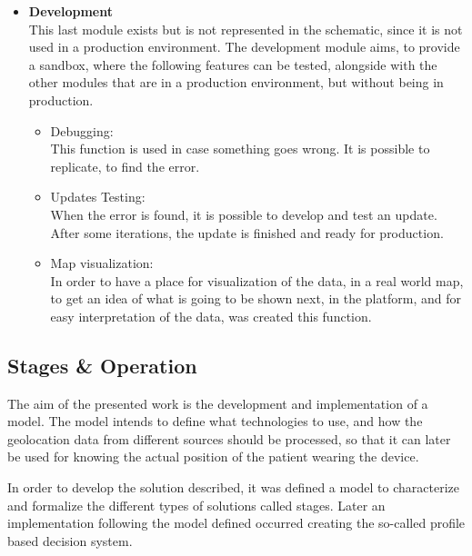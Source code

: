\begin{itemize}
   \item \textbf{Development}\\
   This last module exists but is not represented in the schematic, since it is not used in a production environment. The development module aims, to provide a sandbox, where the following features can be tested, alongside with the other modules that are in a production environment, but without being in production.
   \begin{itemize}
     \item Debugging:  \\This  function is used in case something goes wrong. It is possible to replicate,  to find the error.
   \end{itemize}
   \begin{itemize}
     \item Updates Testing: \\When the error is found, it is possible to develop and test an update. After some iterations, the update is finished and ready for production. 
   \end{itemize}
   \begin{itemize}
     \item Map visualization: \\ In order to have a place for visualization of the data, in a real world map, to get an idea of what is going to be shown next, in the platform, and for easy interpretation of the data, was created this function.
   \end{itemize}
\end{itemize}









\newpage
\subsection{Stages \& Operation}
\label{susec:Stages_Operation}

The aim of the presented work is the development and implementation of a model. The model intends to define what technologies to use, and how the geolocation data from different sources should be processed, so that it can later be used for knowing the actual position of the patient wearing the device.

In order to develop the solution described, it was defined a model to characterize and formalize the different types of solutions called stages. Later an implementation following the model defined occurred creating the so-called profile based decision system.

